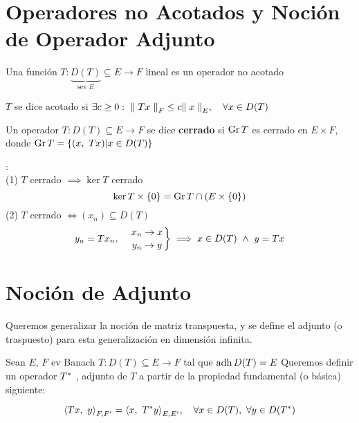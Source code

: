 
\renewcommand{\catnum}{9 (7 No Presencial)}%
\renewcommand{\fecha}{14 de abril de 2020}


\section*{Operadores no Acotados y Noción de Operador Adjunto}

\begin{defn}
Una función $T: \underbrace{D(T)}_{\text{sev $E$}}  \subseteq E \to F$ lineal es un operador no acotado
\end{defn}

\begin{defn}
$T$ se dice acotado si $\exists c \geq 0 :\ \norm[F]{Tx} \leq c \norm[E]{x}, \quad \forall x \in D(T)$
\end{defn}

\begin{defn}
Un operador  $T: D(T)  \subseteq E \to F$ se dice \textbf{cerrado} si $\gr T$ es cerrado en $E \times F$, donde $\gr T = \{ (x,\ Tx) | x \in D(T) \}$
\end{defn}

\begin{note}: \\
(1) $T$ cerrado $\implies \ker T$  cerrado $$\ker T \times \{ 0 \} = \gr T \cap (E \times \{ 0 \})$$
(2) $T$ cerrado $\iff (x_n) \subseteq D(T)$ 
$$y_n = T x_n , \quad 
\left.
x_n \to x \atop
y_n \to y
\right \} \implies x \in D(T) \ \wedge \ y = T x$$
\end{note}

\section*{Noción de Adjunto}

Queremos generalizar la noción de matriz transpuesta, y se define el adjunto (o traspuesto) para esta generalización en dimensión infinita.

Sean $E$, $F$ ev Banach
$T : D(T) \subseteq E \to F$ tal que $\adh D(T) = E$
Queremos definir un operador $T\adj$ , adjunto de $T$ a partir de la propiedad fundamental (o básica) siguiente:

\begin{equation} \label{eqn:op-adj}
    \prodint[F,F']{Tx}{y} = \prodint[E,E']{x}{T\adj y}, \quad \forall x \in D(T),\ \forall y \in D(T\adj)
\end{equation}

